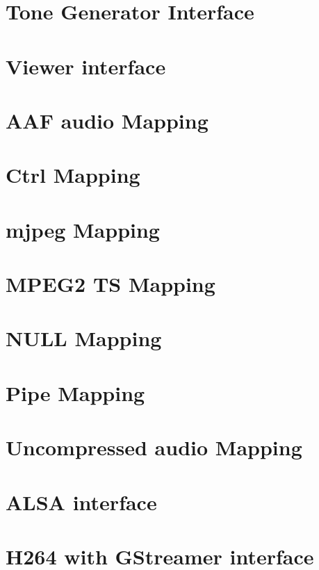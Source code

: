 \documentclass[twoside]{book}
\newcommand{\+}{\discretionary{\mbox{\scriptsize$\hookleftarrow$}}{}{}}
\begin{document}
\chapter{Tone Generator Interface}
\label{tonegen_intf}
\hypertarget{tonegen_intf}{}

\chapter{Viewer interface}
\label{viewer_intf}
\hypertarget{viewer_intf}{}

\chapter{A\+AF audio Mapping}
\label{aaf_audio_map}
\hypertarget{aaf_audio_map}{}

\chapter{Ctrl Mapping}
\label{ctrl_map}
\hypertarget{ctrl_map}{}

\chapter{mjpeg Mapping}
\label{mjpeg_map}
\hypertarget{mjpeg_map}{}

\chapter{M\+P\+E\+G2 TS Mapping}
\label{mpeg2ts_map}
\hypertarget{mpeg2ts_map}{}

\chapter{N\+U\+LL Mapping}
\label{null_map}
\hypertarget{null_map}{}

\chapter{Pipe Mapping}
\label{pipe_map}
\hypertarget{pipe_map}{}

\chapter{Uncompressed audio Mapping}
\label{uncmp_audio_map}
\hypertarget{uncmp_audio_map}{}

\chapter{A\+L\+SA interface}
\label{alsa_intf}
\hypertarget{alsa_intf}{}

\chapter{H264 with G\+Streamer interface}
\label{h264_gst_intf}
\hypertarget{h264_gst_intf}{}

\end{document}
